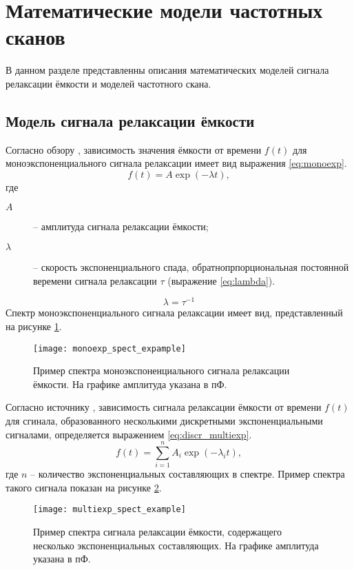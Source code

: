 \section{Математические модели частотных сканов}
    В данном разделе представленны описания математических моделей сигнала
    релаксации ёмкости и моделей частотного скана.


    \subsection{Модель сигнала релаксации ёмкости}
    Согласно обзору \cite{istratov_exp_analysis}, зависимость значения
    ёмкости от времени $f(t)$ для моноэкспоненциального сигнала релаксации
    имеет вид выражения \ref{eq:monoexp}.
    \begin{equation}
        \label{eq:monoexp}
        f(t) = A \exp \left(-\lambda t\right) ,
    \end{equation}
    где
    \begin{description}
        \item[\(A\)] -- амплитуда сигнала релаксации ёмкости;
        \item[\(\lambda\)] -- скорость экспоненциального спада,
        обратнопрпорциональная постоянной веремени сигнала релаксации
        $\tau$ (выражение \ref{eq:lambda}).
    \end{description}
    \begin{equation}
        \label{eq:lambda}
        \lambda = \tau ^ {-1}
    \end{equation}
    Спектр моноэкспоненциального сигнала релаксации имеет вид, 
    представленный на рисунке \ref{pic:monoexp_spect_example}.
    \begin{figure}[!ht]
        \centering
        \texttt{[image: monoexp\_spect\_expample]}
        \caption{Пример спектра моноэкспоненциального сигнала релаксации
        ёмкости. На графике амплитуда указана в пФ.}
        \label{pic:monoexp_spect_example}
    \end{figure}

    Согласно источнику \cite{istratov_exp_analysis}, зависимость сигнала 
    релаксации ёмкости от времени $f(t)$ для сгинала, образованного 
    несколькими дискретными экспоненциальными сигналами, определяется 
    выражением 
    \ref{eq:discr_multiexp}.
    \begin{equation}
        \label{eq:discr_multiexp}
        f(t) = \sum_{i=1}^{n}A_i\exp\left(-\lambda_i t\right) ,
    \end{equation}
    где $n$ -- количество экспоненциальных составляющих в спектре.
    Пример спектра такого сигнала показан на рисунке 
    \ref{pic:multiexp_spect_example}.
    \begin{figure}[!ht]
        \centering
        \texttt{[image: multiexp\_spect\_example]}
        \caption{Пример спектра сигнала релаксации ёмкости, содержащего
        несколько экспоненциальных составляющих. На графике амплитуда указана 
        в пФ.}
        \label{pic:multiexp_spect_example}
    \end{figure}


